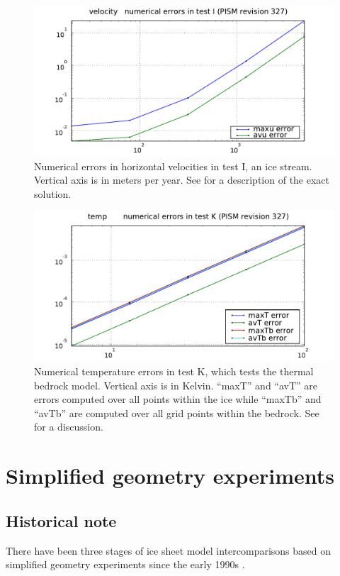 \documentclass[11pt,final]{amsart}
\begin{document}
\begin{figure}[ht]
\includegraphics[width=4.8in,keepaspectratio=true]{figs/velerrs_I}
\caption{Numerical errors in horizontal velocities in test I, an ice stream.  Vertical axis is in meters per year.  See \cite{SchoofStream} for a description of the exact solution.}
\label{fig:velerrsI}
\end{figure}

\begin{figure}[ht]
\includegraphics[width=4.8in,keepaspectratio=true]{figs/temperrs_K}
\caption{Numerical temperature errors in test K, which tests the thermal bedrock model.  Vertical axis is in Kelvin.  ``maxT'' and ``avT'' are errors computed over all points within the ice while ``maxTb'' and ``avTb'' are computed over all grid points within the bedrock.  See \cite{BuelerTestK} for a discussion.}
\label{fig:temperrsK}
\end{figure}


\clearpage\newpage
\section{Simplified geometry experiments}\label{sect:simp}

\subsection{Historical note}  There have been three stages of ice sheet model intercomparisons based on simplified geometry experiments since the early 1990s \cite{BuelerSpray}.
\end{document}
